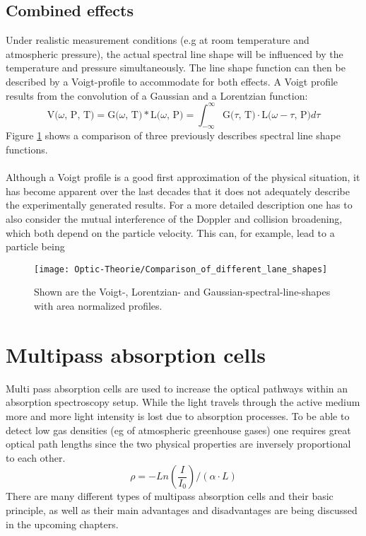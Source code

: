 \subsection{Combined effects}
Under realistic measurement conditions (e.g at room temperature and atmospheric pressure), the actual spectral line shape will be influenced by the temperature and pressure simultaneously. The line shape function can then be described by a Voigt-profile to accommodate for both effects. A Voigt profile results from the convolution of a Gaussian and a Lorentzian function:
\begin{equation}
\text{V($\omega$, P, T)}=\text{G($\omega$, T)} *\text{L($\omega$, P)}  = \int_{-\infty}^{\infty} \text{G($\tau$, T)}  \cdot \text{L($\omega-$$\tau$, P)} d\tau
\label{Voigt-profile}
\end{equation}
Figure \ref{figure:comparison_line_shapes} shows a comparison of three previously describes spectral line shape functions.\\\\ Although a Voigt profile is a good first approximation of the physical situation, it has become apparent over the last decades that it does not adequately describe the experimentally generated results.  For a more detailed description one has to also consider the mutual interference of the Doppler and collision broadening, which both depend on the particle velocity. This can, for example, lead to a particle being 
\begin{figure}[ht]
	\centering
	\texttt{[image: Optic-Theorie/Comparison\_of\_different\_lane\_shapes]}
	\caption{Shown are the Voigt-, Lorentzian- and Gaussian-spectral-line-shapes with area normalized profiles.}
	\label{figure:comparison_line_shapes}
\end{figure}
\section{Multipass absorption cells}
Multi pass absorption cells are used to increase the optical pathways within an absorption spectroscopy setup. While the light travels through the active medium more and more light intensity is lost due to absorption processes. To be able to detect low gas densities (eg of atmospheric greenhouse gases) one requires great optical path lengths since the two physical properties are inversely proportional to each other.
\begin{equation}
\rho=-Ln(\frac{I}{I_0})/(\alpha \cdot L)
\end{equation}
There are many different types of multipass absorption cells and their basic principle, as well as their main advantages and disadvantages are being discussed in the upcoming chapters.
